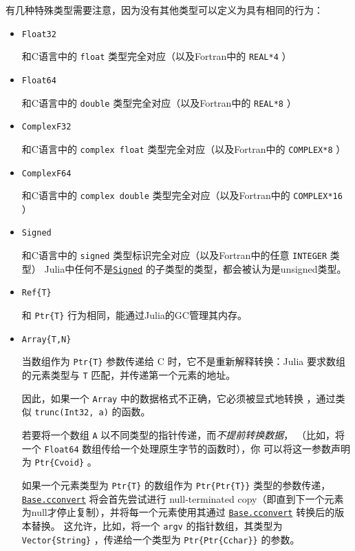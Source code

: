 有几种特殊类型需要注意，因为没有其他类型可以定义为具有相同的行为：



\begin{itemize}
\item \texttt{Float32}

和C语言中的 \texttt{float} 类型完全对应（以及Fortran中的 \texttt{REAL*4} ）


\item \texttt{Float64}

和C语言中的 \texttt{double} 类型完全对应（以及Fortran中的 \texttt{REAL*8} ）


\item \texttt{ComplexF32}

和C语言中的 \texttt{complex float} 类型完全对应（以及Fortran中的 \texttt{COMPLEX*8} ）


\item \texttt{ComplexF64}

和C语言中的 \texttt{complex double} 类型完全对应（以及Fortran中的 \texttt{COMPLEX*16} ）


\item \texttt{Signed}

和C语言中的 \texttt{signed} 类型标识完全对应（以及Fortran中的任意 \texttt{INTEGER} 类型） Julia中任何不是\hyperlink{14154866400772377486}{\texttt{Signed}} 的子类型的类型，都会被认为是unsigned类型。

\end{itemize}


\begin{itemize}
\item \texttt{Ref\{T\}}

和 \texttt{Ptr\{T\}} 行为相同，能通过Julia的GC管理其内存。

\end{itemize}


\begin{itemize}
\item \texttt{Array\{T,N\}}

当数组作为 \texttt{Ptr\{T\}} 参数传递给 C 时，它不是重新解释转换：Julia 要求数组的元素类型与 \texttt{T} 匹配，并传递第一个元素的地址。

因此，如果一个 \texttt{Array} 中的数据格式不正确，它必须被显式地转换 ，通过类似 \texttt{trunc(Int32, a)} 的函数。

若要将一个数组 \texttt{A} 以不同类型的指针传递，而\emph{不提前转换数据}， （比如，将一个 \texttt{Float64} 数组传给一个处理原生字节的函数时），你 可以将这一参数声明为 \texttt{Ptr\{Cvoid\}} 。

如果一个元素类型为 \texttt{Ptr\{T\}} 的数组作为 \texttt{Ptr\{Ptr\{T\}\}} 类型的参数传递， \hyperlink{16487788729383051927}{\texttt{Base.cconvert}}  将会首先尝试进行 null-terminated copy（即直到下一个元素为null才停止复制），并将每一个元素使用其通过 \hyperlink{16487788729383051927}{\texttt{Base.cconvert}} 转换后的版本替换。 这允许，比如，将一个 \texttt{argv} 的指针数组，其类型为 \texttt{Vector\{String\}} ，传递给一个类型为 \texttt{Ptr\{Ptr\{Cchar\}\}} 的参数。

\end{itemize}


